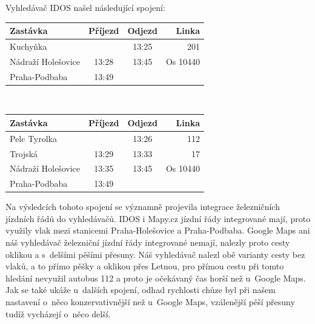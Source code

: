 Vyhledávač IDOS našel následující spojení:\\
\vspace*{-0.5cm}
\begin{center}
\begin{tabular}{|l c c r|}\hline
{\bf Zastávka}&{\bf Příjezd}&{\bf Odjezd}&{\bf Linka}\\\hline
Kuchyňka&&13:25&201\\
Nádraží Holešovice&13:28&13:45&Os 10440\\
Praha-Podbaba&13:49&&\\\hline
\end{tabular}\\
\end{center}
\begin{center}
\begin{tabular}{|l c c r|}\hline
{\bf Zastávka}&{\bf Příjezd}&{\bf Odjezd}&{\bf Linka}\\\hline
Pelc Tyrolka&&13:26&112\\
Trojská&13:29&13:33&17\\
Nádraží Holešovice&13:35&13:45&Os 10440\\
Praha-Podbaba&13:49&&\\\hline
\end{tabular} 
\end{center}

Na výsledcích tohoto spojení se významně projevila integrace železničních
jízdních řádů do vyhledávačů. IDOS i Mapy.cz jízdní řády integrované mají,
proto využily vlak mezi stanicemi Praha-Holešovice a Praha-Podbaba. Google Maps
ani náš vyhledávač železniční jízdní řády integrované nemají, nalezly proto
cesty oklikou a s~delšími pěšími přesuny. Náš vyhledávač nalezl obě varianty
cesty bez vlaků, a to přímo pěšky a oklikou přes Letnou, pro přímou cestu při
tomto hledání nevyužil autobus 112 a proto je očekávaný čas horší než u~Google
Maps. Jak se také ukáže u~dalších spojení, odhad rychlosti chůze byl při našem
nastavení o~něco konzervativnější než u~Google Maps, vzálenější pěší přesuny
tudíž vycházejí o~něco delší.


